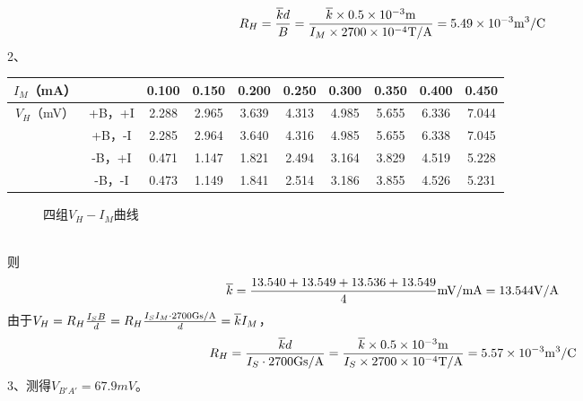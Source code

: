 \documentclass[UTF8]{ctexart}
\begin{document}
$$R_{H}=\frac{\overline{k}d}{B}=\frac{\overline{k}\times 0.5\times 10^{-3}\rm{m}}{I_{M}\times 2700\times 10^{-4}\rm{T/A}}=5.49\times 10^{-3}\rm{m^3/C}$$
2、\begin{table}[H]
    \centering
    \begin{tabular}{c|c|cccccccc}
        \hline
    $I_{M}$（mA）  & & 0.100  & 0.150  & 0.200   & 0.250  & 0.300   & 0.350   & 0.400 & 0.450  \\
    \hline
   \multirow{4}{*}{$V_{H}$（mV）}&+B，+I &2.288 &2.965 &3.639 &4.313  &4.985  &5.655  &6.336  &7.044\\
   \cline{2-10}
   &+B，-I &2.285 &2.964 &3.640 &4.316  &4.985  &5.655  &6.338  &7.045\\
   \cline{2-10}
   &-B，+I &0.471 &1.147 &1.821 &2.494  &3.164  &3.829  &4.519  &5.228\\
   \cline{2-10}
   &-B，-I &0.473 &1.149 &1.841 &2.514  &3.186  &3.855  &4.526  &5.231\\
        \hline                    
    \end{tabular}
    \end{table}
    \begin{figure}[H]
        \centering
\centering
\caption{四组$V_{H}-I_{M}$曲线}
\end{figure}
 ~\\
 则$$\overline{k}=\frac{13.540+13.549+13.536+13.549}{4}\rm{mV/mA}=13.544\rm{V/A}$$
由于$V_{H}=R_{H}\frac{I_{S}B}{d}=R_{H}\frac{I_{S}I_{M}\cdot 2700\rm{Gs/A}}{d}=\overline{k}I_{M}$，
 $$R_{H}=\frac{\overline{k}d}{I_{S}\cdot 2700\rm{Gs/A}}=\frac{\overline{k}\times 0.5\times 10^{-3}\rm{m}}{I_{S}\times 2700\times 10^{-4}\rm{T/A}}=5.57\times 10^{-3}\rm{m^3/C}$$
3、测得$V_{B'A'}=67.9mV$。~\\
\end{document}

